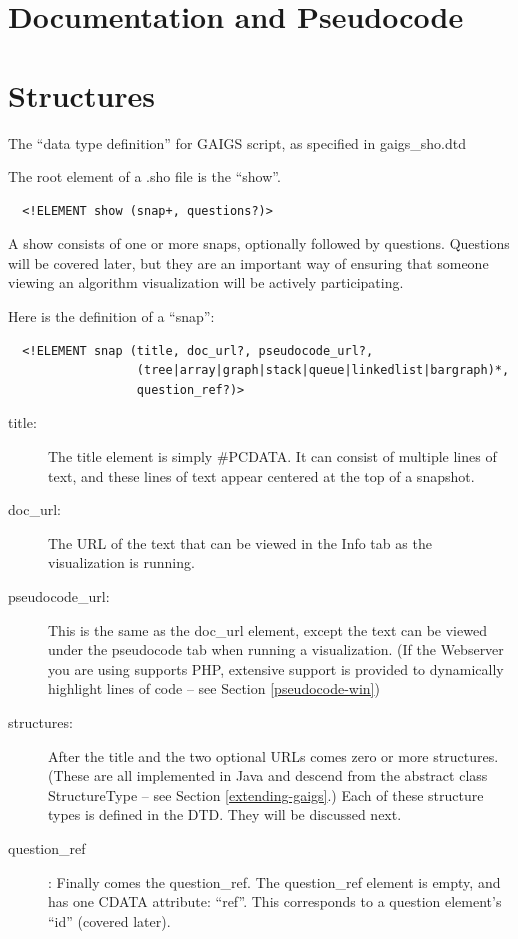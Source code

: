 \documentclass[11pt,letterpaper]{book}
\begin{document}
\section{Documentation and Pseudocode}


\section{Structures}

The ``data type definition'' for GAIGS script, as specified in gaigs\_sho.dtd

The root element of a .sho file is the ``show''.

\footnotesize \begin{verbatim}
  <!ELEMENT show (snap+, questions?)>
\end{verbatim} \normalsize
  
A show consists of one or more snaps, optionally followed by
questions. Questions will be covered later, but they are an
important way of ensuring that someone viewing an algorithm
visualization will be actively participating.


Here is the definition of a ``snap'':

\footnotesize \begin{verbatim}
  <!ELEMENT snap (title, doc_url?, pseudocode_url?,
                  (tree|array|graph|stack|queue|linkedlist|bargraph)*,
                  question_ref?)>
\end{verbatim} \normalsize

\begin{description}
\item[title:]  The title element is simply \#PCDATA. It can consist of
  multiple lines of text, and these lines of text appear centered at
  the top of a snapshot.
  

\item [doc\_url:] The URL of the text that can be viewed in the Info
  tab as the visualization is running. 

  
\item [pseudocode\_url:] This is the same as the doc\_url element,
  except the text can be viewed under the pseudocode tab when running
  a visualization.  (If the Webserver you are using supports PHP,
  extensive support is provided to dynamically highlight lines of code
  -- see Section \ref{pseudocode-win})
  
  
\item [structures:] After the title and the two optional URLs comes
  zero or more structures. (These are all implemented in Java and
  descend from the abstract class StructureType -- see Section
  \ref{extending-gaigs}.) Each of these structure types is defined in
  the DTD. They will be discussed next.
  

\item [question\_ref]: Finally comes the question\_ref. The question\_ref
  element is empty, and has one CDATA attribute: ``ref''. This
  corresponds to a question element's ``id'' (covered later).

\end{description}
\end{document}
